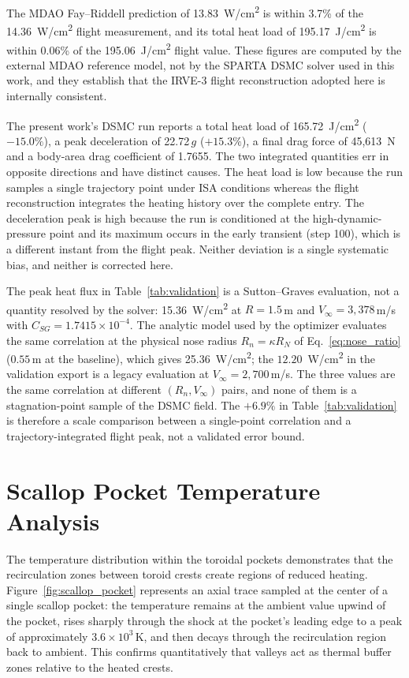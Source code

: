 The MDAO Fay--Riddell prediction of 13.83~W/cm\textsuperscript{2} is within 3.7\% of the 14.36~W/cm\textsuperscript{2} flight measurement, and its total heat load of 195.17~J/cm\textsuperscript{2} is within 0.06\% of the 195.06~J/cm\textsuperscript{2} flight value. These figures are computed by the external MDAO reference model, not by the SPARTA DSMC solver used in this work, and they establish that the IRVE-3 flight reconstruction adopted here is internally consistent.

The present work's DSMC run reports a total heat load of 165.72~J/cm\textsuperscript{2} ($-15.0\%$), a peak deceleration of 22.72\,$g$ ($+15.3\%$), a final drag force of 45{,}613~N and a body-area drag coefficient of 1.7655. The two integrated quantities err in opposite directions and have distinct causes. The heat load is low because the run samples a single trajectory point under ISA conditions whereas the flight reconstruction integrates the heating history over the complete entry. The deceleration peak is high because the run is conditioned at the high-dynamic-pressure point and its maximum occurs in the early transient (step 100), which is a different instant from the flight peak. Neither deviation is a single systematic bias, and neither is corrected here.

The peak heat flux in Table~\ref{tab:validation} is a Sutton--Graves evaluation, not a quantity resolved by the solver: 15.36~W/cm\textsuperscript{2} at $R=1.5$\,m and $V_{\infty}=3{,}378$\,m/s with $C_{SG}=1.7415\times10^{-4}$. The analytic model used by the optimizer evaluates the same correlation at the physical nose radius $R_n=\kappa R_N$ of Eq.~\eqref{eq:nose_ratio} ($0.55$\,m at the baseline), which gives 25.36~W/cm\textsuperscript{2}; the $12.20$~W/cm\textsuperscript{2} in the validation export is a legacy evaluation at $V_{\infty}=2{,}700$\,m/s. The three values are the same correlation at different $(R_n,V_{\infty})$ pairs, and none of them is a stagnation-point sample of the DSMC field. The $+6.9\%$ in Table~\ref{tab:validation} is therefore a scale comparison between a single-point correlation and a trajectory-integrated flight peak, not a validated error bound.

\section{Scallop Pocket Temperature Analysis}
The temperature distribution within the toroidal pockets demonstrates that the recirculation zones between toroid crests create regions of reduced heating. Figure~\ref{fig:scallop_pocket} represents an axial trace sampled at the center of a single scallop pocket: the temperature remains at the ambient value upwind of the pocket, rises sharply through the shock at the pocket's leading edge to a peak of approximately $3.6 \times 10^3$\,K, and then decays through the recirculation region back to ambient. This confirms quantitatively that valleys act as thermal buffer zones relative to the heated crests.

